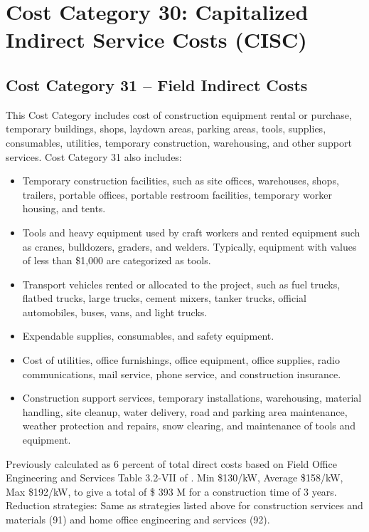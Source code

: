 \section{Cost Category 30: Capitalized Indirect Service Costs (CISC)}





\subsection*{Cost Category 31 – Field Indirect Costs}
This Cost Category includes cost of construction equipment rental or purchase, temporary buildings, shops, laydown areas, parking areas, tools, supplies, consumables, utilities, temporary construction, warehousing, and other support services. Cost Category 31 also includes:

\begin{itemize}
    \item Temporary construction facilities, such as site offices, warehouses, shops, trailers, portable offices, portable restroom facilities, temporary worker housing, and tents.
    \item Tools and heavy equipment used by craft workers and rented equipment such as cranes, bulldozers, graders, and welders. Typically, equipment with values of less than \$1,000 are categorized as tools.
    \item Transport vehicles rented or allocated to the project, such as fuel trucks, flatbed trucks, large trucks, cement mixers, tanker trucks, official automobiles, buses, vans, and light trucks.
    \item Expendable supplies, consumables, and safety equipment.
    \item Cost of utilities, office furnishings, office equipment, office supplies, radio communications, mail service, phone service, and construction insurance.
    \item Construction support services, temporary installations, warehousing, material handling, site cleanup, water delivery, road and parking area maintenance, weather protection and repairs, snow clearing, and maintenance of tools and equipment.
\end{itemize}

Previously calculated as 6 percent of total direct costs based on Field Office Engineering and 
Services Table 3.2-VII of \cite{SCH78}.  Min \$130/kW, Average \$158/kW, Max \$192/kW, to give a total of \$ 393 M for a construction time of 3 years. Reduction strategies: Same as strategies listed above for construction services and  materials (91) and home office engineering and services (92).\\

